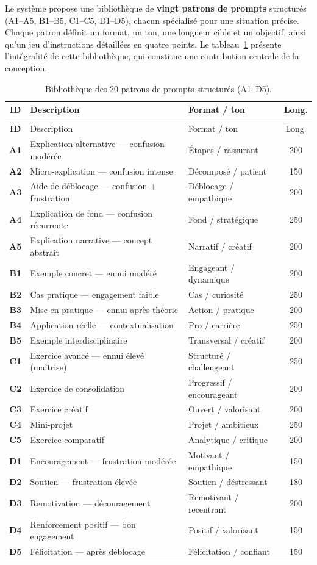 Le système propose une bibliothèque de \textbf{vingt patrons de prompts}
structurés (A1--A5, B1--B5, C1--C5, D1--D5), chacun spécialisé pour une situation
précise. Chaque patron définit un format, un ton, une longueur cible et un
objectif, ainsi qu'un jeu d'instructions détaillées en quatre points. Le
tableau~\ref{tab:templates} présente l'intégralité de cette bibliothèque, qui
constitue une contribution centrale de la conception.

{\small
\begin{longtable}{>{\bfseries}c l l c}
\caption{Bibliothèque des 20 patrons de prompts structurés (A1--D5).}
\label{tab:templates}\\
\toprule
ID & Description & Format / ton & Long. \\
\midrule
\endfirsthead
\multicolumn{4}{l}{\footnotesize\itshape Suite du tableau~\ref{tab:templates}}\\
\toprule
ID & Description & Format / ton & Long. \\
\midrule
\endhead
\bottomrule
\endfoot
\bottomrule
\endlastfoot
A1 & Explication alternative — confusion modérée & Étapes / rassurant & 200 \\
A2 & Micro-explication — confusion intense & Décomposé / patient & 150 \\
A3 & Aide de déblocage — confusion + frustration & Déblocage / empathique & 200 \\
A4 & Explication de fond — confusion récurrente & Fond / stratégique & 250 \\
A5 & Explication narrative — concept abstrait & Narratif / créatif & 200 \\
B1 & Exemple concret — ennui modéré & Engageant / dynamique & 200 \\
B2 & Cas pratique — engagement faible & Cas / curiosité & 250 \\
B3 & Mise en pratique — ennui après théorie & Action / pratique & 200 \\
B4 & Application réelle — contextualisation & Pro / carrière & 250 \\
B5 & Exemple interdisciplinaire & Transversal / créatif & 200 \\
C1 & Exercice avancé — ennui élevé (maîtrise) & Structuré / challengeant & 250 \\
C2 & Exercice de consolidation & Progressif / encourageant & 200 \\
C3 & Exercice créatif & Ouvert / valorisant & 200 \\
C4 & Mini-projet & Projet / ambitieux & 250 \\
C5 & Exercice comparatif & Analytique / critique & 200 \\
D1 & Encouragement — frustration modérée & Motivant / empathique & 150 \\
D2 & Soutien — frustration élevée & Soutien / déstressant & 180 \\
D3 & Remotivation — découragement & Remotivant / recentrant & 200 \\
D4 & Renforcement positif — bon engagement & Positif / valorisant & 150 \\
D5 & Félicitation — après déblocage & Félicitation / confiant & 150 \\
\end{longtable}
}

